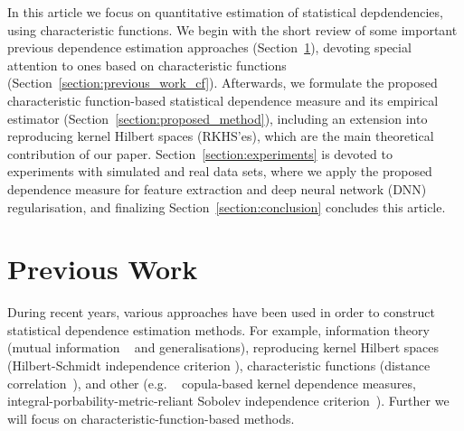 \documentclass{article}
\begin{document}
In this article we focus on quantitative estimation of statistical depdendencies, using characteristic functions. We begin with the short review of some important previous dependence estimation approaches (Section~\ref{section:previous_work}), devoting special attention to ones based on characteristic functions (Section~\ref{section:previous_work_cf}). Afterwards, we formulate the proposed characteristic function-based statistical dependence measure and its empirical estimator (Section~\ref{section:proposed_method}), including an extension into reproducing kernel Hilbert spaces (RKHS'es), which are the main theoretical contribution of our paper. Section~\ref{section:experiments} is devoted to experiments with simulated and real data sets, where we apply the proposed dependence measure for feature extraction and deep neural network (DNN) regularisation,  and finalizing Section~\ref{section:conclusion} concludes this article.

\section{Previous Work}
\label{section:previous_work}
During recent years, various approaches have been used in order to construct statistical dependence estimation methods. For example, information theory (mutual information ~\cite{Cover2006} and generalisations), reproducing kernel Hilbert spaces (Hilbert-Schmidt independence criterion \cite{Gretton2005MeasuringSD}), characteristic functions (distance correlation~\cite{Feuerverger, Szekely}), and other (e.g. ~\cite{Pczos2012CopulabasedKD} copula-based kernel dependence measures, integral-porbability-metric-reliant Sobolev independence criterion~\cite{NIPS2019_9147}).
Further we will focus on characteristic-function-based methods. 
\end{document}
